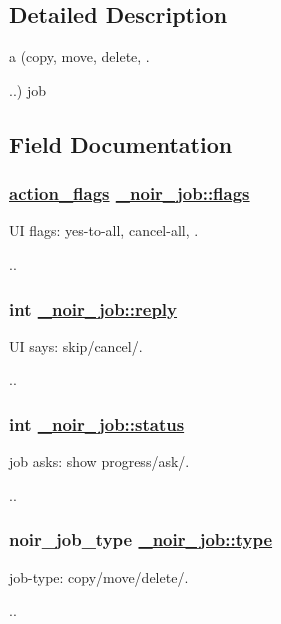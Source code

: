 \subsection{Detailed Description}
a (copy, move, delete, . 

..) job 



\subsection{Field Documentation}
\hypertarget{struct__noir__job_o5}{
\subsubsection[flags]{\setlength{\rightskip}{0pt plus 5cm}\hyperlink{action_8h_a42}{action\_\-flags} \hyperlink{struct__noir__job_o5}{\_\-noir\_\-job::flags}}}
\label{struct__noir__job_o5}


UI flags: yes-to-all, cancel-all, . 

.. \hypertarget{struct__noir__job_o6}{
\subsubsection[reply]{\setlength{\rightskip}{0pt plus 5cm}int \hyperlink{struct__noir__job_o6}{\_\-noir\_\-job::reply}}}
\label{struct__noir__job_o6}


UI says: skip/cancel/. 

.. \hypertarget{struct__noir__job_o3}{
\subsubsection[status]{\setlength{\rightskip}{0pt plus 5cm}int \hyperlink{struct__noir__job_o3}{\_\-noir\_\-job::status}}}
\label{struct__noir__job_o3}


job asks: show progress/ask/. 

.. \hypertarget{struct__noir__job_o2}{
\subsubsection[type]{\setlength{\rightskip}{0pt plus 5cm}noir\_\-job\_\-type \hyperlink{struct__noir__job_o2}{\_\-noir\_\-job::type}}}
\label{struct__noir__job_o2}


job-type: copy/move/delete/. 

.. 